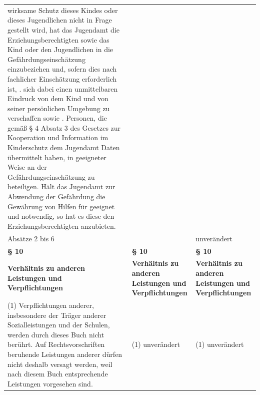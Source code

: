 \documentclass[10pt,a4paper,landscape]{article}
\begin{document}
\begin{longtable}{|L{8.2cm}|L{8.2cm}|L{8.2cm}|}
wirksame  \newline Schutz dieses Kindes oder dieses  \newline Jugendlichen nicht in Frage gestellt wird,  \newline hat das Jugendamt die  \newline Erziehungsberechtigten sowie das Kind  \newline oder den Jugendlichen in die  \newline Gefährdungseinschätzung einzubeziehen  \newline und, sofern dies nach fachlicher  \newline Einschätzung erforderlich ist,   . sich dabei einen unmittelbaren Eindruck  \newline von dem Kind und von seiner persönlichen  \newline Umgebung zu verschaffen sowie   . Personen, die gemäß \S{} 4 Absatz 3 des  \newline Gesetzes zur Kooperation und Information  \newline im Kinderschutz dem Jugendamt Daten  übermittelt haben, in geeigneter Weise an  \newline der Gefährdungseinschätzung zu  \newline beteiligen. Hält das Jugendamt zur  \newline Abwendung der Gefährdung die  \newline Gewährung von Hilfen für geeignet und  \newline notwendig, so hat es diese den  \newline Erziehungsberechtigten anzubieten. \\
\hhline{|---|}
Absätze 2 bis 6 &  & unverändert \\
\hhline{|---|}
\textbf{\S{} 10} & \textbf{\S{} 10} & \textbf{\S{} 10} \\
\hhline{|---|}
\textbf{Verhältnis zu anderen Leistungen und  \newline Verpflichtungen} & \textbf{Verhältnis zu anderen Leistungen und  \newline Verpflichtungen} & \textbf{Verhältnis zu anderen Leistungen und  \newline Verpflichtungen} \\
\hhline{|---|}
(1) Verpflichtungen anderer, insbesondere  \newline der Träger anderer Sozialleistungen und  \newline der Schulen, werden durch dieses Buch  \newline nicht berührt. Auf Rechtsvorschriften  \newline beruhende Leistungen anderer dürfen nicht  \newline deshalb versagt werden, weil nach diesem  \newline Buch entsprechende Leistungen  \newline vorgesehen sind. & (1) unverändert & (1) unverändert \\

\end{longtable}
\end{document}
